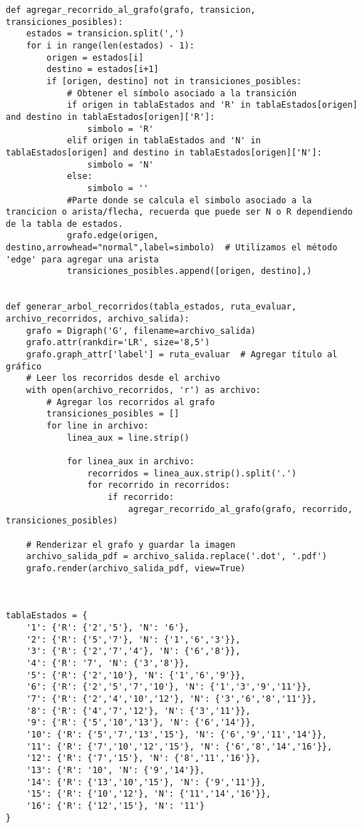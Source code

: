 \begin{enumerate}
\begin{lstlisting}
def agregar_recorrido_al_grafo(grafo, transicion, transiciones_posibles):
    estados = transicion.split(',')
    for i in range(len(estados) - 1):
        origen = estados[i]
        destino = estados[i+1]
        if [origen, destino] not in transiciones_posibles:
            # Obtener el símbolo asociado a la transición
            if origen in tablaEstados and 'R' in tablaEstados[origen] and destino in tablaEstados[origen]['R']:
                simbolo = 'R'
            elif origen in tablaEstados and 'N' in tablaEstados[origen] and destino in tablaEstados[origen]['N']:
                simbolo = 'N'
            else:
                simbolo = ''
            #Parte donde se calcula el simbolo asociado a la trancicion o arista/flecha, recuerda que puede ser N o R dependiendo de la tabla de estados.
            grafo.edge(origen, destino,arrowhead="normal",label=simbolo)  # Utilizamos el método 'edge' para agregar una arista
            transiciones_posibles.append([origen, destino],)
    

def generar_arbol_recorridos(tabla_estados, ruta_evaluar, archivo_recorridos, archivo_salida):
    grafo = Digraph('G', filename=archivo_salida)
    grafo.attr(rankdir='LR', size='8,5')
    grafo.graph_attr['label'] = ruta_evaluar  # Agregar título al gráfico
    # Leer los recorridos desde el archivo
    with open(archivo_recorridos, 'r') as archivo:
        # Agregar los recorridos al grafo
        transiciones_posibles = []
        for line in archivo:
            linea_aux = line.strip()
            
            for linea_aux in archivo:
                recorridos = linea_aux.strip().split('.')
                for recorrido in recorridos:
                    if recorrido:
                        agregar_recorrido_al_grafo(grafo, recorrido, transiciones_posibles)

    # Renderizar el grafo y guardar la imagen
    archivo_salida_pdf = archivo_salida.replace('.dot', '.pdf')
    grafo.render(archivo_salida_pdf, view=True)



tablaEstados = {
    '1': {'R': {'2','5'}, 'N': '6'},
    '2': {'R': {'5','7'}, 'N': {'1','6','3'}},
    '3': {'R': {'2','7','4'}, 'N': {'6','8'}},
    '4': {'R': '7', 'N': {'3','8'}},
    '5': {'R': {'2','10'}, 'N': {'1','6','9'}},
    '6': {'R': {'2','5','7','10'}, 'N': {'1','3','9','11'}},
    '7': {'R': {'2','4','10','12'}, 'N': {'3','6','8','11'}},
    '8': {'R': {'4','7','12'}, 'N': {'3','11'}},
    '9': {'R': {'5','10','13'}, 'N': {'6','14'}},
    '10': {'R': {'5','7','13','15'}, 'N': {'6','9','11','14'}},
    '11': {'R': {'7','10','12','15'}, 'N': {'6','8','14','16'}},
    '12': {'R': {'7','15'}, 'N': {'8','11','16'}},
    '13': {'R': '10', 'N': {'9','14'}},
    '14': {'R': {'13','10','15'}, 'N': {'9','11'}},
    '15': {'R': {'10','12'}, 'N': {'11','14','16'}},
    '16': {'R': {'12','15'}, 'N': '11'}
}


\end{lstlisting}
\end{enumerate}
